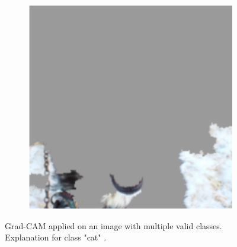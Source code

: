 \begin{figure}[H]
\begin{subfigure}{.5\textwidth}
        \includegraphics[width=0.95\linewidth]{images/wolf2.png}
    \end{subfigure}
    \caption{Grad-CAM applied on an image with multiple valid classes. Explanation for class "cat" \cite{selvaraju2017grad}.}
    \label{grad_cam_cat}
\end{figure}

